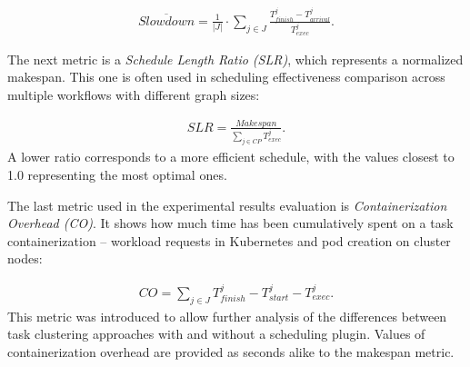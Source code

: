 \begin{align}
\overline{Slowdown}=\frac{1}{{|J|}} \cdot \sum_{j \in J} \frac{T_{finish}^j - T_{arrival}^j}{T_{exec}^j}
.
\end{align}


The next metric is a \emph{Schedule Length Ratio (SLR)}, which represents a normalized makespan.
This one is often used in scheduling effectiveness comparison across multiple workflows with different graph sizes:

\begin{align}
SLR=\frac{Makespan}{\sum_{j \in CP} T_{exec}^j}
.
\end{align}
A lower ratio corresponds to a more efficient schedule, with the values closest to 1.0 representing the most optimal ones.

The last metric used in the experimental results evaluation is \emph{Containerization Overhead (CO)}.
It shows how much time has been cumulatively spent on a task containerization -- workload requests in Kubernetes and pod creation on cluster nodes:

\begin{align}
CO=\sum_{j \in J} T_{finish}^j - T_{start}^j - T_{exec}^j
.
\end{align}
This metric was introduced to allow further analysis of the differences between task clustering approaches with and without a scheduling plugin. Values of containerization overhead are provided as seconds alike to the makespan metric.